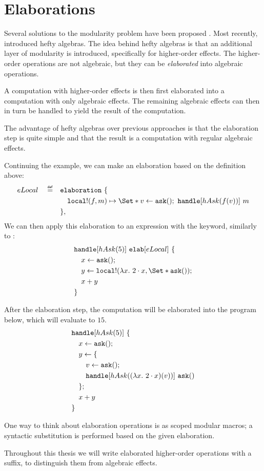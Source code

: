 \section{Elaborations}\label{sec:elab}

Several solutions to the modularity problem have been proposed \autocite{wu_effect_2014, oh_latent_2021}. Most recently, \textcite{bach_poulsen_hefty_2023} introduced hefty algebras. The idea behind hefty algebras is that an additional layer of modularity is introduced, specifically for higher-order effects. The higher-order operations are not algebraic, but they can be \emph{elaborated} into algebraic operations.

A computation with higher-order effects is then first elaborated into a computation with only algebraic effects. The remaining algebraic effects can then in turn be handled to yield the result of the computation.

The advantage of hefty algebras over previous approaches is that the elaboration step is quite simple and that the result is a computation with regular algebraic effects.

Continuing the \olocal example, we can make an elaboration based on the definition above:
\begin{align*}
    eLocal \quad\defeq\quad
        &\elaboration\ \{ \\
        &\quad\olocal!(f, m) \mapsto \S{v \gets \oask()\seq \handle[hAsk(f(v))]\ m }\\
        &\},
\end{align*}
We can then apply this elaboration to an expression with the \elab keyword, similarly to \handle:
\begin{align*}
    &\handle[hAsk(5)]\ \elab[eLocal]\ \{ \\
    &\quad x \gets \oask();\\
    &\quad y \gets \olocal!(\lambda x.\ 2\cdot x, \S{ \oask() });\\
    &\quad x + y \\
    &\}
\end{align*}

After the elaboration step, the computation will be elaborated into the program below, which will evaluate to $15$.
\begin{align*}
    &\mathbf{\mathtt{handle}}[hAsk(5)]\ \{ \\
    &\quad x \gets \mathtt{ask}();\\
    &\quad y \gets \{\\
    &\quad\quad v \gets \mathtt{ask}();\\
    &\quad\quad \mathbf{\mathtt{handle}}[hAsk((\lambda x.\ 2\cdot x)(v))]\ \mathtt{ask}()\\
    &\quad\};\\
    &\quad x + y \\
    &\}
\end{align*}

One way to think about elaboration operations is as scoped modular macros; a syntactic substitution is performed based on the given elaboration.

Throughout this thesis we will write elaborated higher-order operations with a \code{!} suffix, to distinguish them from algebraic effects.
